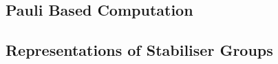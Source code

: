 \documentclass{standalone}
\begin{document}
\subsection{Pauli Based Computation}
\subsection{Representations of Stabiliser Groups}

\ifstandalone

\fi
\end{document}
